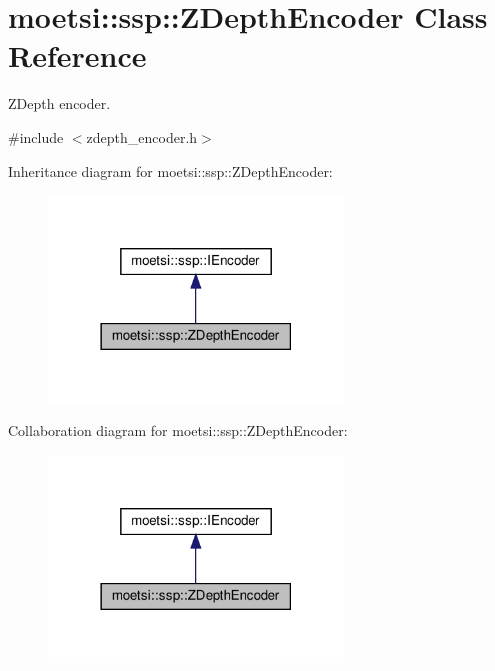 \hypertarget{classmoetsi_1_1ssp_1_1ZDepthEncoder}{}\section{moetsi\+:\+:ssp\+:\+:Z\+Depth\+Encoder Class Reference}
\label{classmoetsi_1_1ssp_1_1ZDepthEncoder}


Z\+Depth encoder.  




{\ttfamily \#include $<$zdepth\+\_\+encoder.\+h$>$}



Inheritance diagram for moetsi\+:\+:ssp\+:\+:Z\+Depth\+Encoder\+:
\nopagebreak
\begin{figure}[H]
\begin{center}
\leavevmode
\includegraphics[width=222pt]{classmoetsi_1_1ssp_1_1ZDepthEncoder__inherit__graph}
\end{center}
\end{figure}


Collaboration diagram for moetsi\+:\+:ssp\+:\+:Z\+Depth\+Encoder\+:
\nopagebreak
\begin{figure}[H]
\begin{center}
\leavevmode
\includegraphics[width=222pt]{classmoetsi_1_1ssp_1_1ZDepthEncoder__coll__graph}
\end{center}
\end{figure}
